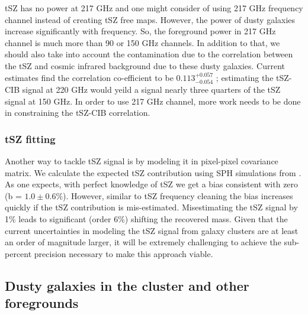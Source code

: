 tSZ has no power at 217 GHz and one might consider of using 217 GHz frequency channel instead of creating tSZ free maps. 
However, the power of dusty galaxies increase significantly with frequency.
So, the foreground power in 217 GHz channel is much more than 90 or 150 GHz channels. 
In addition to that, we should also take into account the contamination due to the correlation between the tSZ and cosmic infrared background due to these dusty galaxies.
 Current estimates find the correlation co-efficient to be $0.113^{+0.057}_{-0.054}$ \citep{george15}; estimating the tSZ-CIB signal at 220 GHz would yeild a signal nearly three quarters of the tSZ signal at 150 GHz. 
 In order to use 217 GHz channel, more work needs to be done in constraining the tSZ-CIB correlation.
 
 \subsubsection{tSZ fitting}
 Another way to tackle tSZ signal is by modeling it in pixel-pixel covariance matrix.
 We calculate the expected tSZ contribution using SPH simulations from \citet{mccarthy13}.
As one expects, with perfect knowledge of tSZ we get a bias consistent with zero (b = $1.0 \pm 0.6\%$).
However, similar to tSZ frequency cleaning the bias increases quickly if the tSZ contribution is mis-estimated.
Misestimating the tSZ signal by 1\% leads to significant (order 6\%) shifting the recovered mass.
Given that the current uncertainties in modeling the tSZ signal from galaxy clusters are at least an order of magnitude larger, it will be extremely challenging to achieve the sub-percent precision necessary to make this approach viable.
 
 
 
 \subsection{Dusty galaxies in the cluster and other foregrounds}
\label{sec_DG_sys_bias}


